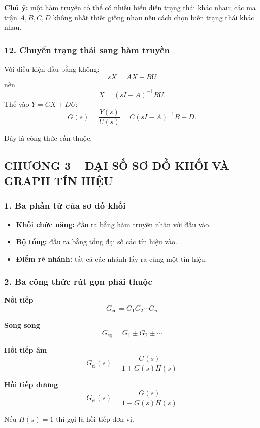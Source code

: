 \textbf{Chú ý:} một hàm truyền có thể có nhiều biểu diễn trạng thái khác nhau; các ma trận
$A,B,C,D$ không nhất thiết giống nhau nếu cách chọn biến trạng thái khác nhau.

\subsubsection*{12. Chuyển trạng thái sang hàm truyền}

Với điều kiện đầu bằng không:
\[
sX=AX+BU
\]
nên
\[
X=(sI-A)^{-1}BU.
\]
Thế vào $Y=CX+DU$:
\[
\boxed{
G(s)=\frac{Y(s)}{U(s)}
=C(sI-A)^{-1}B+D.
}
\]

Đây là công thức cần thuộc.


\subsection*{CHƯƠNG 3 -- ĐẠI SỐ SƠ ĐỒ KHỐI VÀ GRAPH TÍN HIỆU}

\subsubsection*{1. Ba phần tử của sơ đồ khối}

\begin{itemize}
  \item \textbf{Khối chức năng:} đầu ra bằng hàm truyền nhân với đầu vào.
  \item \textbf{Bộ tổng:} đầu ra bằng tổng đại số các tín hiệu vào.
  \item \textbf{Điểm rẽ nhánh:} tất cả các nhánh lấy ra cùng một tín hiệu.
\end{itemize}

\subsubsection*{2. Ba công thức rút gọn phải thuộc}

\textbf{Nối tiếp}
\[
\boxed{
G_{\mathrm{eq}}=G_1G_2\cdots G_n
}
\]

\textbf{Song song}
\[
\boxed{
G_{\mathrm{eq}}=G_1\pm G_2\pm\cdots
}
\]

\textbf{Hồi tiếp âm}
\[
\boxed{
G_{\mathrm{cl}}(s)=\frac{G(s)}{1+G(s)H(s)}
}
\]

\textbf{Hồi tiếp dương}
\[
\boxed{
G_{\mathrm{cl}}(s)=\frac{G(s)}{1-G(s)H(s)}
}
\]

Nếu $H(s)=1$ thì gọi là hồi tiếp đơn vị.

